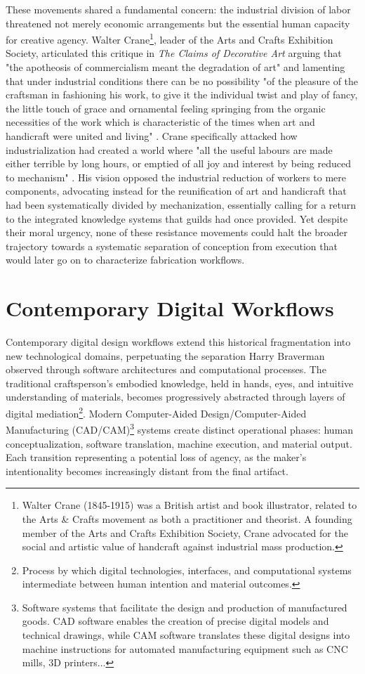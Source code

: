 These movements shared a fundamental concern: the industrial division of labor threatened not merely economic arrangements but the essential human capacity for creative agency. Walter Crane\footnote{Walter Crane (1845-1915) was a British artist and book illustrator, related to the Arts \& Crafts movement as both a practitioner and theorist. A founding member of the Arts and Crafts Exhibition Society, Crane advocated for the social and artistic value of handcraft against industrial mass production.}, leader of the Arts and Crafts Exhibition Society, articulated this critique in \textit{The Claims of Decorative Art} arguing that "the apotheosis of commercialism meant the degradation of art" \citep{crane1892} and lamenting that under industrial conditions there can be no possibility "of the pleasure of the craftsman in fashioning his work, to give it the individual twist and play of fancy, the little touch of grace and ornamental feeling springing from the organic necessities of the work which is characteristic of the times when art and handicraft were united and living" \citep{crane1892}. Crane specifically attacked how industrialization had created a world where "all the useful labours are made either terrible by long hours, or emptied of all joy and interest by being reduced to mechanism" \citep{crane1892}. His vision opposed the industrial reduction of workers to mere components, advocating instead for the reunification of art and handicraft that had been systematically divided by mechanization, essentially calling for a return to the integrated knowledge systems that guilds had once provided. Yet despite their moral urgency, none of these resistance movements could halt the broader trajectory towards a systematic separation of conception from execution that would later go on to characterize fabrication workflows.

\section{Contemporary Digital Workflows}

Contemporary digital design workflows extend this historical fragmentation into new technological domains, perpetuating the separation Harry Braverman observed through software architectures and computational processes. The traditional craftsperson's embodied knowledge, held in hands, eyes, and intuitive understanding of materials, becomes progressively abstracted through layers of digital mediation\footnote{Process by which digital technologies, interfaces, and computational systems intermediate between human intention and material outcomes.}. Modern Computer-Aided Design/Computer-Aided Manufacturing (CAD/CAM)\footnote{Software systems that facilitate the design and production of manufactured goods. CAD software enables the creation of precise digital models and technical drawings, while CAM software translates these digital designs into machine instructions for automated manufacturing equipment such as CNC mills, 3D printers...} systems create distinct operational phases: human conceptualization, software translation, machine execution, and material output. Each transition representing a potential loss of agency, as the maker's intentionality becomes increasingly distant from the final artifact.

